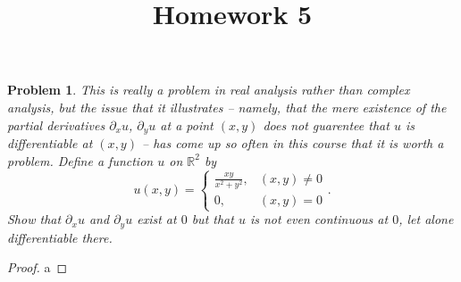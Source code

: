 \documentclass[11pt, letterpaper]{article}
\title{Homework 5}
\theoremstyle{plain}
\newtheorem{problem}{Problem}
\begin{document}
\makeproblem

\begin{problem}
	This is really a problem in real analysis rather than complex analysis, but the issue that it illustrates -- namely, that the mere \emph{existence} of the partial derivatives $\partial _xu$, $\partial _yu$ at a point $(x,y)$ does not guarentee that $u$ is differentiable at $(x,y)$ -- has come up so often in this course that it is worth a problem. Define a function $u$ on $\mathbb{R} ^2$ by
	\[
		u(x,y)=
		\begin{cases}
			\frac{xy}{x^2+y^2} ,&(x,y)\neq 0\\
			0,&(x,y)=0
		\end{cases}
	.\]
	Show that $\partial _xu$ and $\partial _yu$ exist at $0$ but that $u$ is not even continuous at $0$, let alone differentiable there.
\end{problem}
\begin{proof}
	a
\end{proof}
\end{document}
